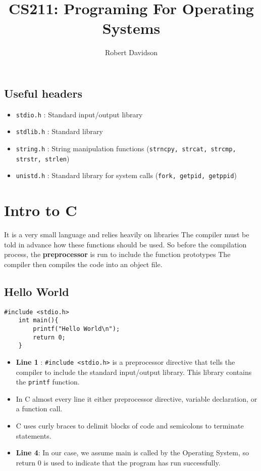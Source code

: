 \documentclass[a4paper, 10pt]{article}
\title{
\textbf{CS211: Programing For Operating Systems} \\ 
}
\author{
Robert Davidson
}
\date{}
\begin{document}
\maketitle
\pagebreak

\tableofcontents
\pagebreak
\subsection*{Useful headers}
\begin{itemize}
    \item \texttt{stdio.h} : Standard input/output library
    \item \texttt{stdlib.h} : Standard library
    \item  \texttt{string.h} : String manipulation functions (\texttt{strncpy, strcat, strcmp, strstr, strlen})
    \item \texttt{unistd.h} : Standard library for system calls (\texttt{fork, getpid, getppid})
\end{itemize}




\pagebreak
\section{Intro to C}

It is a very small language and relies heavily on libraries
The compiler must be told in advance how these functions should be used. So before the compilation process, the \textbf{preprocessor} is run to include the function prototypes The compiler then compiles the code into an object file.

\subsection{Hello World}
\begin{lstlisting}[style=cStyle, caption={Hello World in C}]
    #include <stdio.h>
    int main(){
        printf("Hello World\n");
        return 0;
    }
    \end{lstlisting}
\begin{itemize}
    \item \textbf{Line 1} : \texttt{\#include <stdio.h>} is a preprocessor directive that tells the compiler to include the standard input/output library. This library contains the \texttt{printf} function.
    \item In C almost every line it either preprocessor directive, variable declaration, or a function call.
    \item C uses curly braces to delimit blocks of code and semicolons to terminate statements.
    \item \textbf{Line 4}: In our case, we assume main is called by the Operating System, so return 0 is used to indicate that the program has run successfully.
\end{itemize}
\end{document}
